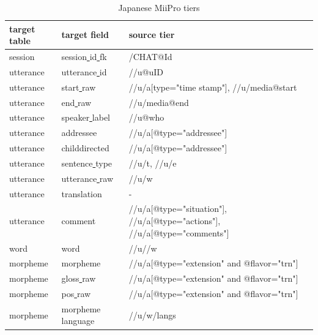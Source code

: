 \documentclass[a4paper, 11pt]{book}
\newcommand{\und}{\underline{{ }}\hspace{0.2mm}}	%
\begin{document}
\begin{table}[ht!]
	\centering
	\begin{tabular}{lll}
		\toprule
			\textbf{target table} & \textbf{target field} & \textbf{source tier} \\
		\midrule
			session 	& session\und id\und fk 	& /CHAT@Id \\
			utterance 	& utterance\und id	& //u@uID \\
			utterance 	& start\und raw		& //u/a[type="time stamp"], //u/media@start \\
			utterance 	& end\und raw		& //u/media@end \\
			utterance 	& speaker\und label	& //u@who \\
			utterance 	& addressee			& //u/a[@type="addressee"] \\
			utterance 	& childdirected		& //u/a[@type="addressee"] \\
			utterance 	& sentence\und type	& //u/t, //u/e \\
			utterance 	& utterance\und raw	& //u/w \\ %
			utterance 	& translation		& - \\
			utterance 	& comment			& //u/a[@type="situation"], //u/a[@type="actions"], //u/a[@type="comments"] \\

			word	 	& word		& //u//w \\
			morpheme	& morpheme			& //u/a[@type="extension" and @flavor="trn"] \\
			morpheme	& gloss\und raw		& //u/a[@type="extension" and @flavor="trn"] \\
			morpheme	& pos\und raw		& //u/a[@type="extension" and @flavor="trn"] \\
			morpheme	& morpheme\und language	& //u/w/langs \\

		\bottomrule
	\end{tabular}
	\caption{Japanese MiiPro tiers}
	\label{tab:Japanese MiiPro tiers}
\end{table}
\end{document}
